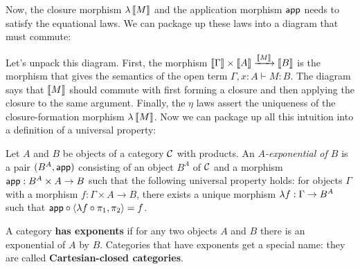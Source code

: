 Now, the closure morphism $\lambda \left\llbracket M \right\rrbracket$ 
and the application morphism $\mathsf{app}$ needs to satisfy the equational 
laws. We can package up these laws into a diagram that must commute:

\begin{center}
\end{center}

Let's unpack this diagram. First, the morphism $\left\llbracket \Gamma \right\rrbracket \times
\left\llbracket A \right\rrbracket \xrightarrow{\left\llbracket M \right\rrbracket} \left\llbracket B \right\rrbracket$ is the morphism that  gives 
the semantics of the open term $\Gamma, x : A \vdash M : B$. 
The diagram says that $\left\llbracket M \right\rrbracket$ should commute with first forming a 
closure and then applying the closure to the same argument.
Finally, the $\eta$ laws assert the uniqueness of the closure-formation 
morphism $\lambda \left\llbracket M \right\rrbracket$. Now we can package up all this intuition 
into a definition of a universal property:

\begin{definition} \label{def:exponential}
  \sloppy
  Let \(A\) and \(B\) be objects of a category \(\mathcal C\) with products.
  An \emph{\(A\)-exponential of \(B\)}
  is a pair \((B^A,\mathsf{app})\) consisting of
  an object \(B^A\) of \(\mathcal C\)
  and a morphism
  \(\mathsf{app} : B^A \times A \to B\)
  such that the following universal property holds:
  for objects $\Gamma$ with a morphism \(f : \Gamma \times A \to B\),
  there exists a unique morphism \(\lambda f : \Gamma \to B^A\)
  such that \(\mathsf{app} \circ \langle \lambda f \circ \pi_1, \pi_2\rangle = f\).
\end{definition}

A category \textbf{has exponents} if for any two objects $A$ and 
$B$ there is an exponential of $A$ by $B$.
Categories that have exponents get a special name: they are called
\textbf{Cartesian-closed categories}. 

